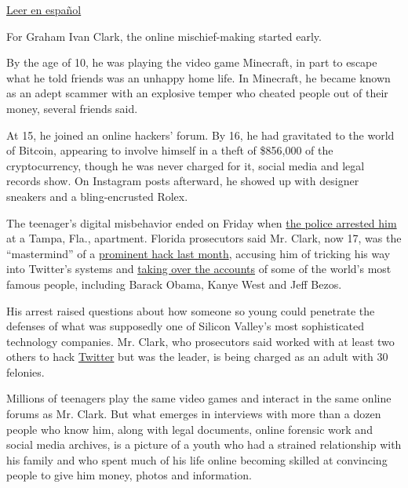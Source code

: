 \href{https://www.nytimes3xbfgragh.onion/es/2020/08/04/espanol/negocios/joven-florida-hacker-twitter.html}{Leer
en español}

For Graham Ivan Clark, the online mischief-making started early.

By the age of 10, he was playing the video game Minecraft, in part to
escape what he told friends was an unhappy home life. In Minecraft, he
became known as an adept scammer with an explosive temper who cheated
people out of their money, several friends said.

At 15, he joined an online hackers' forum. By 16, he had gravitated to
the world of Bitcoin, appearing to involve himself in a theft of
\$856,000 of the cryptocurrency, though he was never charged for it,
social media and legal records show. On Instagram posts afterward, he
showed up with designer sneakers and a bling-encrusted Rolex.

The teenager's digital misbehavior ended on Friday when
\href{https://www.nytimes3xbfgragh.onion/2020/07/31/technology/twitter-hack-arrest.html}{the
police arrested him} at a Tampa, Fla., apartment. Florida prosecutors
said Mr. Clark, now 17, was the ``mastermind'' of a
\href{https://www.nytimes3xbfgragh.onion/2020/07/17/technology/twitter-hackers-interview.html}{prominent
hack last month}, accusing him of tricking his way into Twitter's
systems and
\href{https://www.nytimes3xbfgragh.onion/2020/07/15/technology/twitter-hack-bill-gates-elon-musk.html}{taking
over the accounts} of some of the world's most famous people, including
Barack Obama, Kanye West and Jeff Bezos.

His arrest raised questions about how someone so young could penetrate
the defenses of what was supposedly one of Silicon Valley's most
sophisticated technology companies. Mr. Clark, who prosecutors said
worked with at least two others to hack
\href{https://www.nytimes3xbfgragh.onion/2020/08/03/technology/ftc-twitter-privacy-violations.html}{Twitter}
but was the leader, is being charged as an adult with 30 felonies.

Millions of teenagers play the same video games and interact in the same
online forums as Mr. Clark. But what emerges in interviews with more
than a dozen people who know him, along with legal documents, online
forensic work and social media archives, is a picture of a youth who had
a strained relationship with his family and who spent much of his life
online becoming skilled at convincing people to give him money, photos
and information.

